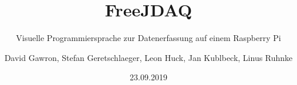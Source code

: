 \documentclass{beamer}
\title{FreeJDAQ}
\subtitle{Visuelle Programmiersprache zur Datenerfassung auf
einem Raspberry Pi}
\author{David Gawron, Stefan Geretschlaeger, Leon Huck,
Jan Kublbeck, Linus Ruhnke }
\date{23.09.2019}
\begin{document}
\begin{frame}
\titlepage
\end{frame}
\end{document}
